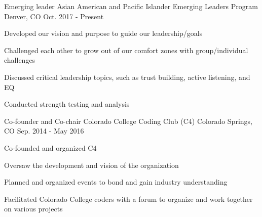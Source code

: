 


\begin{cventries}


\vspace{-.25em}
\cventry
{Emerging leader} %
{Asian American and Pacific Islander Emerging Leaders Program} %
{Denver, CO} %
{Oct. 2017 - Present} %
{ %
\begin{cvitems}
\item {Developed our vision and purpose to guide our leadership/goals}
\item {Challenged each other to grow out of our comfort zones with group/individual challenges}
\item {Discussed critical leadership topics, such as trust building, active listening, and EQ}
\item {Conducted strength testing and analysis}
\end{cvitems}
}


\vspace{-1.25em}
\cventry
{Co-founder and Co-chair} %
{Colorado College Coding Club (C4)} %
{Colorado Springs, CO} %
{Sep. 2014 - May 2016} %
{ %
\begin{cvitems}
\item {Co-founded and organized C4}
\item {Oversaw the development and vision of the organization}
\item {Planned and organized events to bond and gain industry understanding}
\item {Facilitated Colorado College coders with a forum to organize and work together on various projects}
\end{cvitems}
}


\end{cventries}
